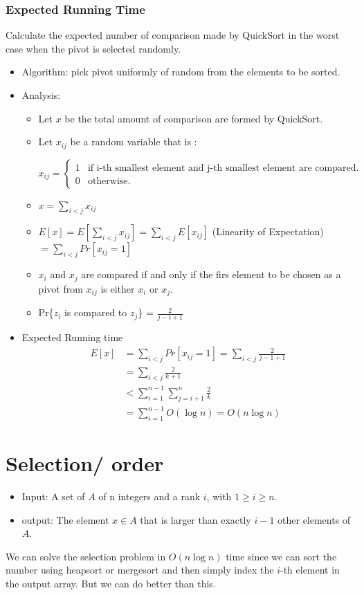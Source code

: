 \documentclass[en,hazy,blue,screen,14pt]{elegantnote}
\begin{document}
\subsubsection{Expected Running Time}
Calculate the expected number of comparison made by QuickSort in the worst 
case when the pivot is selected randomly.
\begin{itemize}
\item Algorithm: pick pivot uniformly of random from the elements to be
sorted.
\item Analysis:
\begin{itemize}
\item Let $x$ be the total amount of comparison are formed by QuickSort. 
\item Let $x_{ij}$ be a random variable that is : 

$$x_{ij}=
\begin{cases}
1 & \text{if i-th smallest element and j-th smallest element are compared.}\\
0 & \text{otherwise.}
\end{cases}
$$
\item $x=\sum_{i<j}x_{ij}$
\item $E[x]=E[\sum_{i<j}x_{ij}]=\sum_{i<j}E[x_{ij}]$ (Linearity of Expectation)
$=\sum_{i<j}Pr[x_{ij}=1]$
\item $x_{i}$ and $x_{j}$ are compared if and only if the firs element
to be chosen as a pivot from $x_{ij}$ is either $x_{i}$ or $x_{j}$.
\item Pr\{$z_{i}$ is compared to $z_{j}$\} = $\frac{2}{j-i+1}$
\end{itemize}
\item 
Expected 
Running time
\begin{align*}
 E[x]&=\sum_{i<j}Pr[x_{ij}=1]
 =\sum_{i<j}\frac{2}{j-1+1}\\
 &=\sum_{i<j} \frac { 2 } { k+1 }\\
 &<\sum_{i=1}^{n-1}\sum_{j=i+1}^{n}\frac{2}{k}\\
 &=\sum_{i=1}^{n-1}O(\log n)=O(n\log n)
\end{align*}
\end{itemize}

\section{Selection/ order}
\begin{itemize}
\item Input: A set of $A$ of n integers and a rank $i$, with $1\ge i\ge n$.
\item output: The element $x\in A$ that is larger than exactly $i-1$ other
elements of $A$.
\end{itemize}
We can solve the selection problem in $O(n\log n)$ time since we
can sort the number using heapsort or mergesort and then simply index
the $i$-th element in the output array. But we can do better than this.
\end{document}
